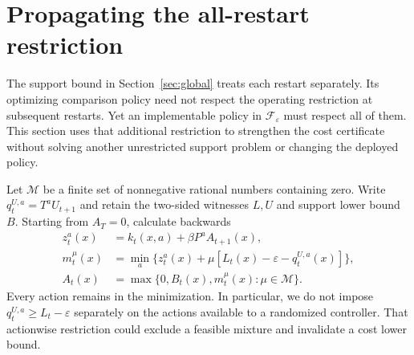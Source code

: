 \section{Propagating the all-restart restriction}\label{sec:restart}
The support bound in Section~\ref{sec:global} treats each restart separately. Its optimizing comparison policy need not respect the operating restriction at subsequent restarts. Yet an implementable policy in $\mathcal F_\varepsilon$ must respect all of them. This section uses that additional restriction to strengthen the cost certificate without solving another unrestricted support problem or changing the deployed policy.

Let $\mathcal M$ be a finite set of nonnegative rational numbers containing zero. Write $q_t^{U,a}=T^aU_{t+1}$ and retain the two-sided witnesses $L,U$ and support lower bound $B$. Starting from $A_T=0$, calculate backwards
\begin{align}
 z_t^a(x)&=k_t(x,a)+\beta P^aA_{t+1}(x),\label{eq:restart-z}\\
 m_t^\mu(x)&=\min_a\{z_t^a(x)+\mu[L_t(x)-\varepsilon-q_t^{U,a}(x)]\},\label{eq:restart-m}\\
 A_t(x)&=\max\{0,B_t(x),m_t^\mu(x):\mu\in\mathcal M\}.\label{eq:restart-a}
\end{align}
Every action remains in the minimization. In particular, we do not impose $q_t^{U,a}\ge L_t-\varepsilon$ separately on the actions available to a randomized controller. That actionwise restriction could exclude a feasible mixture and invalidate a cost lower bound.

